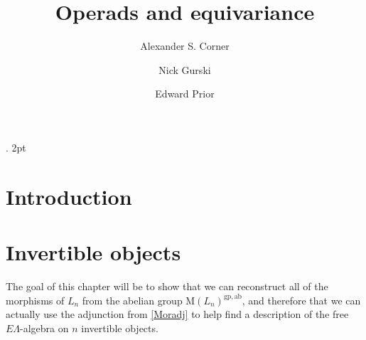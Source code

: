 \documentclass{amsbook} %
\numberwithin{section}{chapter}
\begin{document}
\newtheorem{thm}{Theorem}[section]
\newtheorem{prop}[thm]{Proposition}
\newtheorem{lem}[thm]{Lemma}
\newtheorem{cor}[thm]{Corollary}

%
     {}%
     {}%
     {\bfseries}%
     {.}%
     {2pt}%
     {}%
		
		

   \theoremstyle{example}
	\newtheorem{conv}[thm]{Conventions}
   \newtheorem{nota}[thm]{Notation}
   \newtheorem{example}[thm]{Example}
	\newtheorem{Defi}[thm]{Definition}
   \newtheorem{rem}[thm]{Remark}

   \title[Operads]{Operads and equivariance}

\author{Alexander S. Corner}
\address{}
\author{Nick Gurski}
\address{}
\author{Edward Prior}
\address{}
\email{}
\keywords{}
\subjclass{}

\maketitle

\tableofcontents


\chapter{Introduction}








\chapter{Invertible objects}


The goal of this chapter will be to show that we can reconstruct all of the morphisms of $L_n$ from the abelian group $\mathrm{M}(L_n)^{\mathrm{gp, ab}}$, and therefore that we can actually use the adjunction from \cref{Moradj} to help find a description of the free $E\Lambda$-algebra on $n$ invertible objects. 
\end{document}
